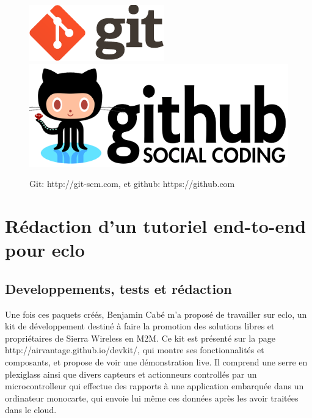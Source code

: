 \documentclass{article}
\begin{document}
\begin{figure}[h!]
    \centering
    \includegraphics[width=\linewidth/3]{img/git.png}
    \includegraphics[width=\linewidth/3]{img/github.png}
    \caption{Git: http://git-scm.com, et github: https://github.com}
\end{figure}

\clearpage

\section{Rédaction d’un tutoriel end-to-end pour eclo}
\subsection{Developpements, tests et rédaction}

Une fois ces paquets créés, Benjamin Cabé m’a proposé de travailler sur eclo, un kit de développement destiné à faire la promotion des solutions libres et propriétaires de Sierra Wireless en M2M. Ce kit est présenté sur la page http://airvantage.github.io/devkit/, qui montre ses fonctionnalités et composants, et propose de voir une démonstration live.
Il comprend une serre en plexiglass ainsi que divers capteurs et actionneurs controllés par un microcontrolleur qui effectue des rapports à une application embarquée dans un ordinateur monocarte, qui envoie lui même ces données après les avoir traitées dans le cloud.
\end{document}
